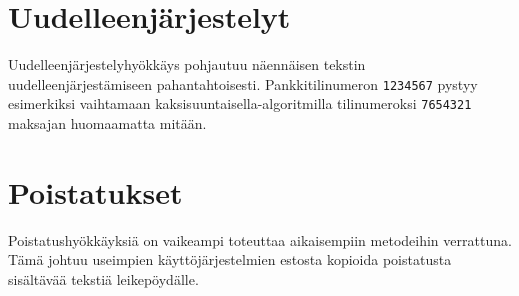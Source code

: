 \section{Uudelleenjärjestelyt}
Uudelleenjärjestelyhyökkäys pohjautuu näennäisen tekstin uudelleenjärjestämiseen pahantahtoisesti. Pankkitilinumeron \texttt{1234567} pystyy esimerkiksi vaihtamaan kaksisuuntaisella-algoritmilla tilinumeroksi \texttt{7654321} maksajan huomaamatta mitään.

\section{Poistatukset}
Poistatushyökkäyksiä on vaikeampi toteuttaa aikaisempiin metodeihin verrattuna. Tämä johtuu useimpien käyttöjärjestelmien estosta kopioida poistatusta sisältävää tekstiä leikepöydälle.